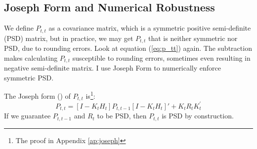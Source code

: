 \documentclass[12pt]{article}
\numberwithin{equation}{section}
\begin{document}
\subsection{Joseph Form and Numerical Robustness}
We define $P_{t,t}$ as a covariance matrix, which is a symmetric positive semi-definite (PSD) matrix, but in practice, we may get $P_{t,t}$ that is neither symmetric nor PSD, due to rounding errors. Look at equation (\ref{eq:p_tt}) again. The subtraction makes calculating $P_{t,t}$ susceptible to rounding errors, sometimes even resulting in negative semi-definite matrix. I use Joseph Form to numerically enforce symmetric PSD. 

The Joseph form (\cite{joseph_1968}) of $P_{t,t}$ is\footnote{The proof in Appendix \ref{ap:joseph}}:
\[
    P_{t,t} = [I - K_tH_t]P_{t,t-1}[I - K_tH_t]' + K_tR_tK_t^{'}    
\]
If we guarantee $P_{t,t-1}$ and $R_t$ to be PSD, then $P_{t,t}$ is PSD by construction. 
\end{document}
